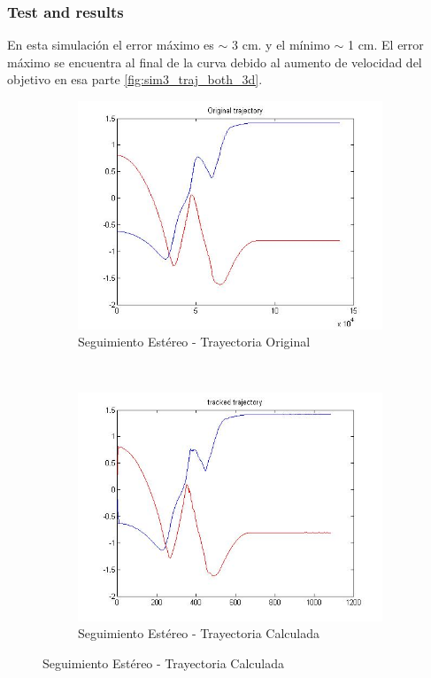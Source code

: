 \subsubsection{Test and results}

	En esta simulaci\'on el error m\'aximo es $\sim$ 3 cm. y el m\'inimo $\sim$ 1 cm. El error m\'aximo se encuentra al final de la curva debido al aumento de velocidad del objetivo en esa parte \ref{fig:sim3_traj_both_3d}.
	

\begin{figure}[hp]
	\centering
	\begin{subfigure}[hp]{0.4\linewidth}
		\centering
		\includegraphics[width=\linewidth]{../Images/c3/sim3_traj_ori}
		\caption{Seguimiento Est\'ereo - Trayectoria Original}
		\label{fig:sim3_traj_ori}
	\end{subfigure}
	~
	\begin{subfigure}[hp]{0.4\linewidth}
		\centering
		\includegraphics[width=\linewidth]{../Images/c3/sim3_traj_track}
		\caption{Seguimiento Est\'ereo - Trayectoria Calculada}
		\label{fig:sim3_traj_track}
	\end{subfigure}
\end{figure}


